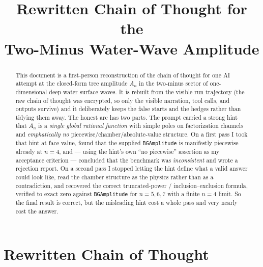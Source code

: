 \documentclass{article}
\title{Rewritten Chain of Thought for the\\
Two-Minus Water-Wave Amplitude}
\author{}
\date{}
\begin{document}
\maketitle

\begin{abstract}
This document is a first-person reconstruction of the chain of thought for one
AI attempt at the closed-form tree amplitude $A_n$ in the two-minus sector of
one-dimensional deep-water surface waves. It is rebuilt from the visible run
trajectory (the raw chain of thought was encrypted, so only the visible
narration, tool calls, and outputs survive) and it deliberately keeps the false
starts and the hedges rather than tidying them away. The honest arc has two
parts. The prompt carried a strong hint that $A_n$ is a \emph{single global
rational function} with simple poles on factorization channels and
\emph{emphatically no} piecewise/chamber/absolute-value structure. On a first
pass I took that hint at face value, found that the supplied \texttt{BGAmplitude}
is manifestly piecewise already at $n=4$, and --- using the hint's own ``no
piecewise'' assertion as my acceptance criterion --- concluded that the
benchmark was \emph{inconsistent} and wrote a rejection report. On a second pass
I stopped letting the hint define what a valid answer could look like, read the
chamber structure as the physics rather than as a contradiction, and recovered
the correct truncated-power / inclusion--exclusion formula, verified to exact
zero against \texttt{BGAmplitude} for $n=5,6,7$ with a finite $n=4$ limit. So the
final result is correct, but the misleading hint cost a whole pass and very
nearly cost the answer.
\end{abstract}

\section*{Rewritten Chain of Thought}
\end{document}
